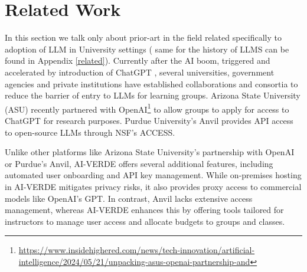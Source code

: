 \section{Related Work}
In this section we talk only about prior-art in the field  related specifically to adoption of LLM in University settings ( same for the history of  LLMS can be found in Appendix \ref{related}). Currently after the AI boom,  triggered and accelerated by introduction of ChatGPT \cite{openai2022chatgpt},  several universities, government agencies and private institutions have established collaborations and consortia to reduce the barrier of entry to LLMs for learning groups. Arizona State University (ASU) recently partnered with OpenAI\footnote{\url{https://www.insidehighered.com/news/tech-innovation/artificial-intelligence/2024/05/21/unpacking-asus-openai-partnership-and}} to allow groups to apply for access to ChatGPT for research purposes. Purdue University's Anvil \citep{10.1145/3491418.3530766} provides API access to open-source LLMs through NSF's ACCESS. 


Unlike other platforms like Arizona State University’s partnership with OpenAI or Purdue’s Anvil, AI-VERDE offers several additional features, including automated user onboarding and API key management. While on-premises hosting in AI-VERDE mitigates privacy risks, it also provides proxy access to commercial models like OpenAI's GPT. In contrast, Anvil lacks extensive access management, whereas AI-VERDE enhances this by offering tools tailored for instructors to manage user access and allocate budgets to groups and classes.




%